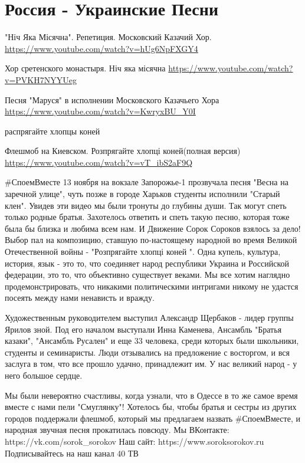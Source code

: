  
 
 
 
 
\section{Россия - Украинские Песни}
\label{sec:songs.rossia_poet_ukrainskie}

"Ніч Яка Місячна". Репетиция. Московский Казачий Хор.
\url{https://www.youtube.com/watch?v=hUg6NpFXGY4}

Хор сретенского монастыря. Ніч яка місячна
\url{https://www.youtube.com/watch?v=PVKH7NYYUeg}

Песня "Маруся" в исполнении Московского Казачьего Хора
\url{https://www.youtube.com/watch?v=KwryxBU_Y0I}

распрягайте хлопцы коней


Флешмоб на Киевском. Розпрягайте хлопці коней(полная версия)
\url{https://www.youtube.com/watch?v=vT_ibS2aF9Q}

#СпоемВместе
13 ноября на вокзале Запорожье-1 прозвучала песня "Весна на заречной улице", чуть позже в городе Харьков студенты исполнили "Старый клен". Увидев эти видео мы были тронуты до глубины души. Так могут спеть только родные братья. Захотелось ответить и спеть такую песню, которая тоже была бы близка и любима всем нам. И Движение Сорок Сороков взялось за дело! Выбор пал на композицию, ставшую по-настоящему народной во время Великой Отечественной войны - "Розпрягайте хлопці коней ".
Одна купель, культура, история, язык - это то, что соединяет народ республики Украина и Российской федерации, это то, что объективно существует веками. Мы все хотим наглядно продемонстрировать, что никакими политическими интригами никому не удастся посеять между нами ненависть и вражду.

Художественным руководителем выступил Александр Щербаков - лидер группы Ярилов зной. Под его началом выступали Инна Каменева, Ансамбль "Братья казаки", "Ансамбль Русален" и еще 33 человека, среди которых были школьники, студенты и семинаристы. Люди отзывались на предложение с восторгом, и вся заслуга в том, что все прошло удачно, принадлежит им. У нас великий народ - у него большое сердце.

Мы были невероятно счастливы, когда узнали, что в Одессе в то же самое время вместе с нами пели "Смуглянку"! 
Хотелось бы, чтобы братья и сестры из других городов поддержали флешмоб, который мы предлагаем назвать #СпоемВместе​, и народная звучная песня прокатилась повсюду.
Мы ВКонтакте: https://vk.com/sorok_sorokov
Наш сайт: https://www.soroksorokov.ru
Подписывайтесь на наш канал 40 ТВ

